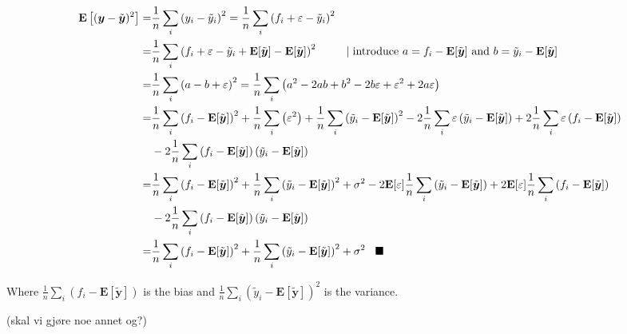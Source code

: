 \documentclass[a4paper,10pt,english]{article}
\begin{document}
\begin{align}
\mathbf{E}\left[(\boldsymbol{y}-\tilde{\boldsymbol{y}})^{2}\right] 
=& \frac{1}{n} \sum_{i} \left( y_i - \tilde{y}_i \right)^2
= \frac{1}{n} \sum_{i} \left( f_i + \varepsilon - \tilde{y}_i \right)^2 \\
=& \frac{1}{n} \sum_{i} \left( f_i + \varepsilon - \tilde{y}_i  + \mathbf{E}[\tilde{\boldsymbol{y}}] - \mathbf{E}[\tilde{\boldsymbol{y}}] \right)^2 \hspace{0.9cm} 
| \hspace{0.1cm} \text{introduce $a = f_i - \mathbf{E}[\tilde{\boldsymbol{y}}] $ and $b = \tilde{y}_i - \mathbf{E}[\tilde{\boldsymbol{y}}]$}\\
=& \frac{1}{n} \sum_{i} \left( a - b + \varepsilon \right)^2
= \frac{1}{n} \sum_{i} \left( a^2 - 2ab + b^2 - 2b\varepsilon + \varepsilon^2 + 2a\varepsilon \right)\\
=& \frac{1}{n} \sum_{i} \left( f_i - \mathbf{E}[\tilde{\boldsymbol{y}}] \right)^2 
+ \frac{1}{n} \sum_{i} \left( \varepsilon^2 \right)
+ \frac{1}{n} \sum_{i} \left( \tilde{y}_i - \mathbf{E}[\tilde{\boldsymbol{y}}] \right)^2 
- 2\frac{1}{n} \sum_{i} \varepsilon \left( \tilde{y}_i - \mathbf{E}[\tilde{\boldsymbol{y}}] \right)
+ 2\frac{1}{n} \sum_{i} \varepsilon \left( f_i - \mathbf{E}[\tilde{\boldsymbol{y}}] \right)\\
&- 2\frac{1}{n} \sum_{i} \left( f_i - \mathbf{E}[\tilde{\boldsymbol{y}}] \right) \left( \tilde{y}_i - \mathbf{E}[\tilde{\boldsymbol{y}}] \right)\\
=& \frac{1}{n} \sum_{i} \left( f_i - \mathbf{E}[\tilde{\boldsymbol{y}}] \right)^2 
+ \frac{1}{n} \sum_{i} \left( \tilde{y}_i - \mathbf{E}[\tilde{\boldsymbol{y}}] \right)^2 
+ \sigma^2
- 2 \mathbf{E}[\varepsilon] \frac{1}{n} \sum_{i} \left( \tilde{y}_i - \mathbf{E}[\tilde{\boldsymbol{y}}] \right)
+ 2 \mathbf{E}[\varepsilon] \frac{1}{n} \sum_{i} \left( f_i - \mathbf{E}[\tilde{\boldsymbol{y}}] \right)\\
&- 2\frac{1}{n} \sum_{i} \left( f_i - \mathbf{E}[\tilde{\boldsymbol{y}}] \right) \left( \tilde{y}_i - \mathbf{E}[\tilde{\boldsymbol{y}}] \right)\\
=& \frac{1}{n} \sum_{i} \left( f_i - \mathbf{E}[\tilde{\boldsymbol{y}}] \right)^2 
+ \frac{1}{n} \sum_{i} \left( \tilde{y}_i - \mathbf{E}[\tilde{\boldsymbol{y}}] \right)^2 
+ \sigma^2 \hspace{0.3cm} \blacksquare
\end{align}

Where $\frac{1}{n} \sum_{i} \left( f_i - \mathbf{E}[\tilde{\boldsymbol{y}}] \right)$ is the bias and
$\frac{1}{n} \sum_{i} \left( \tilde{y}_i - \mathbf{E}[\tilde{\boldsymbol{y}}] \right)^2$ is the variance. 

(skal vi gjøre noe annet og?)
\end{document}
